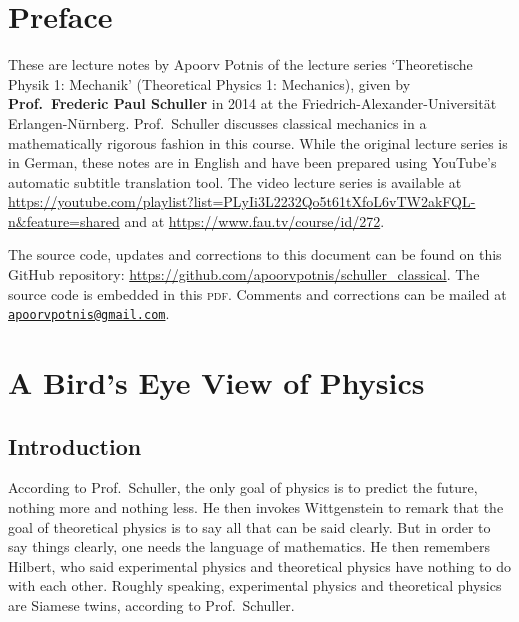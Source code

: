\documentclass[a4 paper, 12pt]{book}
\theoremstyle{definition}
\begin{document}
    \maketitle
    \hypertarget{TitlePage}{}
    
    \frontmatter

    \chapter*{Preface}
    \hypertarget{Preface}{}

    These are lecture notes by Apoorv Potnis of the lecture series `Theoretische Physik 1: Mechanik' (Theoretical Physics 1: Mechanics), given by \textbf{Prof.\ Frederic Paul Schuller} in 2014 at the Friedrich-Alexander-Universität Erlangen-Nürnberg. Prof.\ Schuller discusses classical mechanics in a mathematically rigorous fashion in this course. While the original lecture series is in German, these notes are in English and have been prepared using YouTube's automatic subtitle translation tool. The video lecture series is available at \url{https://youtube.com/playlist?list=PLyIi3L2232Qo5t61tXfoL6vTW2akFQL-n&feature=shared} and at \url{https://www.fau.tv/course/id/272}.

    The source code, updates and corrections to this document can be found on this GitHub repository: \url{https://github.com/apoorvpotnis/schuller_classical}. The source code is embedded in this \textsc{pdf}. Comments and corrections can be mailed at \href{mailto:apoorvpotnis@gmail.com}{\texttt{apoorvpotnis@gmail.com}}.

    \clearpage
    
    \tableofcontents
    \hypertarget{Contents}{}

    \mainmatter

    \chapter{A Bird's Eye View of Physics}

    \section{Introduction}

    According to Prof.\ Schuller, the only goal of physics is to predict the future, nothing more and nothing less. He then invokes Wittgenstein to remark that the goal of theoretical physics is to say all that can be said clearly. But in order to say things clearly, one needs the language of mathematics. He then remembers Hilbert, who said experimental physics and theoretical physics have nothing to do with each other. Roughly speaking, experimental physics and theoretical physics are Siamese twins, according to Prof.\ Schuller.
\end{document}
